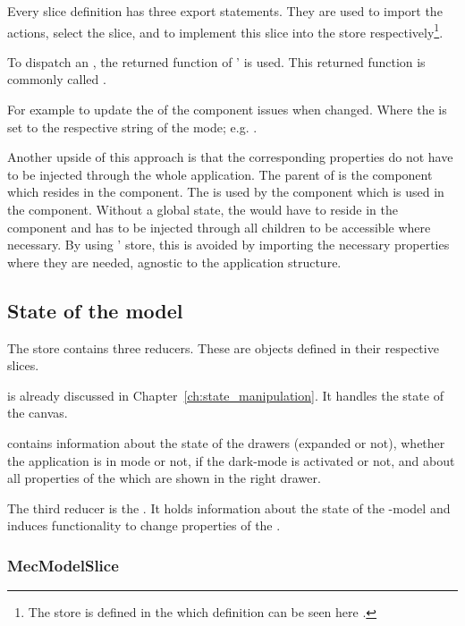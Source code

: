 Every slice definition has three export statements.
They are used to import the actions, select the slice, and to implement this slice into the store respectively\footnote{The store is defined in the  which definition can be seen here .}. %

To dispatch an , the returned function of '  is used.
This returned function is commonly called .

For example to update the  of  the  component issues  when changed.
Where the  is set to the respective string of the mode; e.g. .

Another upside of this approach is that the corresponding properties do not have to be injected through the whole application.
The parent of  is the  component which resides in the  component.
The  is used by the  component which is used in the  component.
Without a global state, the  would have to reside in the  component and has to be injected through all children to be accessible where necessary.
By using ' store, this is avoided by importing the necessary properties where they are needed, agnostic to the application structure.

\subsection{State of the  model}\label{ch:state_mec2_model}

The store contains three reducers.
These are objects defined in their respective slices.

 is already discussed in Chapter~\ref{ch:state_manipulation}.
It handles the state of the canvas.

 contains information about the state of the drawers (expanded or not), whether the application is in  mode or not, if the dark-mode is activated or not, and about all properties of the  which are shown in the right drawer.

The third reducer is the .
It holds information about the state of the -model and induces functionality to change properties of the .

\subsubsection{MecModelSlice}

